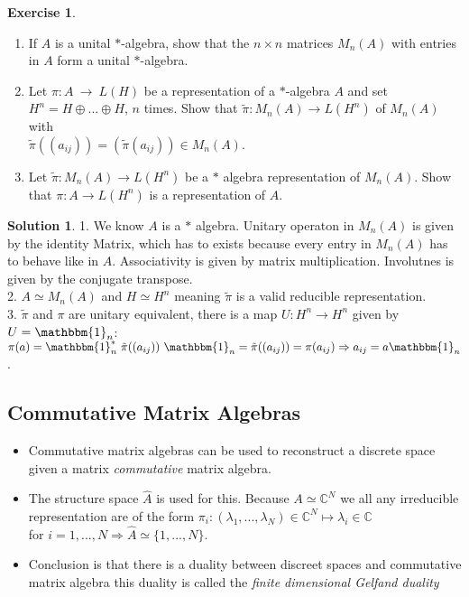 \documentclass[a4paper]{article}
\theoremstyle{definition}
\theoremstyle{definition}
\theoremstyle{theorem}
\theoremstyle{theorem}
\newtheorem{exercise}{Exercise}
\theoremstyle{definition}
\newtheorem{solution}{Solution}
\begin{document}
\begin{exercise}
    \begin{enumerate}
        \item If $A$ is a unital $*$-algebra, show that the $n \times n$ matrices $M_n(A)$ with entries
            in $A$ form a unital $*$-algebra.
        \item Let $\pi :A\ \rightarrow \ L(H)$ be a representation of a $*$-algebra $A$ and set
            $H^n = H \oplus ... \oplus H$, $n$ times. Show that $\tilde{\pi}:M_n(A) \rightarrow L(H^n)$
            of $M_n(A)$ with\\
            $\tilde{\pi}((a_{ij})) = (\tilde{\pi}(a_{ij})) \in M_n(A)$.
        \item Let $\tilde{\pi}:M_n(A) \rightarrow L(H^n)$ be a $*$ algebra representation of $M_n(A)$.
            Show that $\pi: A \rightarrow L(H^n)$ is a representation of $A$.
    \end{enumerate}
\end{exercise}

\begin{solution}
    1. We know $A$ is a $*$ algebra. Unitary operaton in $M_n(A)$ is given by the identity Matrix, which
    has to exists because every entry in $M_n(A)$ has to behave like in $A$. Associativity is given by
    matrix multiplication. Involutnes is given by the conjugate transpose.\\
    2. $A \simeq M_n(A)$ and $H \simeq H^n$ meaning $\tilde{\pi}$ is a valid reducible representation.\\
    3. $\tilde{\pi}$ and $\pi$ are unitary equivalent, there is a map $U: H^n \rightarrow H^n$ given by
    $U=\mathbbm{1}_n$:\\
    $\pi (a) = \mathbbm{1}_n^*\ \tilde{\pi}((a_{ij}))\ \mathbbm{1}_n = \tilde{\pi}((a_{ij})) = \pi (a_{ij})
    \Rightarrow a_{ij} = a\mathbbm{1}_n$.
\end{solution}

\subsection{Commutative Matrix Algebras}
\begin{itemize}
    \item Commutative matrix algebras can be used to reconstruct a discrete space given
        a matrix \textit{commutative} matrix algebra.
    \item The structure space $\hat{A}$ is used for this. Because $A \simeq \mathbb{C}^N$ we all any
        irreducible representation are of the form
        $\pi _i:(\lambda_1,...,\lambda_N)\in \mathbb{C}^N \mapsto \lambda_i \in \mathbb{C}$ \\
        for $i = 1,...,N \Rightarrow \hat{A} \simeq \{1,...,N\}.$
    \item Conclusion is that there is a duality between discreet spaces and commutative matrix algebra
        this duality is called the \textit{finite dimensional Gelfand duality}
\end{itemize}
\end{document}
